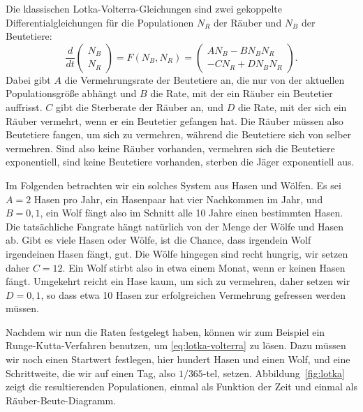 Die klassischen Lotka-Volterra-Gleichungen sind zwei gekoppelte
Differentialgleichungen für die Populationen $N_R$ der Räuber und
$N_B$ der Beutetiere:
\begin{equation}
  \label{eq:lotka-volterra}
  \frac{d}{dt}
  \begin{pmatrix}
    N_B\\
    N_R
  \end{pmatrix}
  = F(N_B, N_R) = 
  \begin{pmatrix}
    A N_B  - B N_BN_R\\
    -C N_R + D N_BN_R
  \end{pmatrix}.
\end{equation}
Dabei gibt $A$ die Vermehrungsrate der Beutetiere an, die nur von der
aktuellen Populationsgröße abhängt und $B$ die Rate, mit der ein
Räuber ein Beutetier auffrisst. $C$ gibt die Sterberate der Räuber an,
und $D$ die Rate, mit der sich ein Räuber vermehrt, wenn er ein
Beutetier gefangen hat. Die Räuber müssen also Beutetiere fangen, um
sich zu vermehren, während die Beutetiere sich von selber
vermehren. Sind also keine Räuber vorhanden, vermehren sich die
Beutetiere exponentiell, sind keine Beutetiere vorhanden, sterben die
Jäger exponentiell aus.

Im Folgenden betrachten wir ein solches System aus Hasen und
Wölfen. Es sei $A=2$ Hasen pro Jahr, \dh ein Hasenpaar hat vier
Nachkommen im Jahr, und $B=0,1$, ein Wolf fängt also im Schnitt alle
10 Jahre einen bestimmten Hasen. Die tatsächliche Fangrate hängt
natürlich von der Menge der Wölfe und Hasen ab. Gibt es viele Hasen
oder Wölfe, ist die Chance, dass irgendein Wolf irgendeinen Hasen
fängt, gut. Die Wölfe hingegen sind recht hungrig, wir setzen daher
$C=12$. Ein Wolf stirbt also in etwa einem Monat, wenn er keinen Hasen
fängt. Umgekehrt reicht ein Hase kaum, um sich zu vermehren, daher
setzen wir $D=0,1$, so dass etwa 10 Hasen zur erfolgreichen Vermehrung
gefressen werden müssen.

Nachdem wir nun die Raten festgelegt haben, können wir zum Beispiel
ein Runge-Kutta-Verfahren benutzen, um \eqref{eq:lotka-volterra} zu
lösen. Dazu müssen wir noch einen Startwert festlegen, hier hundert
Hasen und einen Wolf, und eine Schrittweite, die wir auf einen Tag,
also $1/365$-tel, setzen. Abbildung~\ref{fig:lotka} zeigt die
resultierenden Populationen, einmal als Funktion der Zeit und einmal
als Räuber-Beute-Diagramm.

